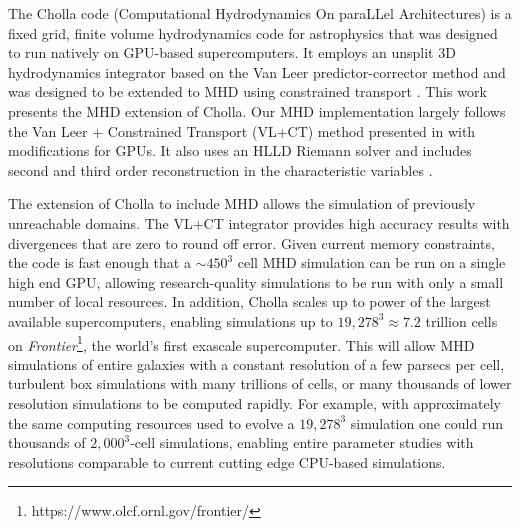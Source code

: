 \documentclass[modern, linenumbers]{aastex631}
\begin{document}
The Cholla code (Computational Hydrodynamics On paraLLel Architectures) \citep{schneider_2015} is a fixed grid, finite volume hydrodynamics code for astrophysics that was designed to run natively on GPU-based supercomputers. It employs an unsplit 3D hydrodynamics integrator based on the Van Leer predictor-corrector method \citep{falle_1991, van_leer_2006} and was designed to be extended to MHD using constrained transport \citep{evans_1988}. This work presents the MHD extension of Cholla. Our MHD implementation largely follows the Van Leer + Constrained Transport (VL+CT) method presented in \cite{stone_2009} with modifications for GPUs. It also uses an HLLD Riemann solver \citep{hlld_2005} and includes second \citep{stone_2009} and third \citep{felker_2018} order reconstruction in the characteristic variables \citep{stone_athena_2008}.

The extension of Cholla to include MHD allows the simulation of previously unreachable domains. The VL+CT integrator provides high accuracy results with divergences that are zero to round off error. Given current memory constraints, the code is fast enough that a $\sim450^3$ cell MHD simulation can be run on a single high end GPU, allowing research-quality simulations to be run with only a small number of local resources. In addition, Cholla scales up to power of the largest available supercomputers, enabling simulations up to $19,278^3 \approx 7.2$ trillion cells on \textit{Frontier}\footnote{https://www.olcf.ornl.gov/frontier/}, the world's first exascale supercomputer. This will allow MHD simulations of entire galaxies with a constant resolution of a few parsecs per cell, turbulent box simulations with many trillions of cells, or many thousands of lower resolution simulations to be computed rapidly. For example, with approximately the same computing resources used to evolve a $19,278^3$ simulation one could run thousands of $2,000^3$-cell simulations, enabling entire parameter studies with resolutions comparable to current cutting edge CPU-based simulations.
\end{document}
